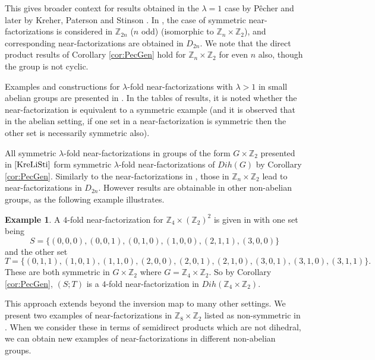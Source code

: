 \documentclass[12pt, a4paper]{article}
\theoremstyle{definition}
\newtheorem{example}[theorem]{Example}
\begin{document}
This gives broader context for results obtained in the $\lambda=1$ case by P\^{e}cher \cite{Pec} and later by Kreher, Paterson and Stinson \cite{KrePatSti}.  In \cite{KrePatSti}, the case of symmetric near-factorizations is considered in $\mathbb{Z}_{2n}$ ($n$ odd) (isomorphic to $\mathbb{Z}_n \times \mathbb{Z}_2$), and corresponding near-factorizations are obtained in $D_{2n}$. We note that the direct product results of Corollary \ref{cor:PecGen} hold for $\mathbb{Z}_n \times \mathbb{Z}_2$ for even $n$ also, though the group is not cyclic.

Examples and constructions for $\lambda$-fold near-factorizations with $\lambda>1$ in small abelian groups are presented in \cite{KreLiSti}.  In the tables of results, it is noted whether the near-factorization is equivalent to a symmetric example (and it is observed that in the abelian setting, if one set in a near-factorization is symmetric then the other set is necessarily symmetric also).  

All symmetric $\lambda$-fold near-factorizations in groups of the form $G \times \mathbb{Z}_2$ presented in $\cite{KreLiSti}$ form symmetric $\lambda$-fold near-factorizations of $Dih(G)$ by Corollary \ref{cor:PecGen}.  Similarly to the near-factorizations in \cite{Pec,KrePatSti}, those in $\mathbb{Z}_n \times \mathbb{Z}_2$ lead to near-factorizations in $D_{2n}$.  However results are obtainable in other non-abelian groups, as the following example illustrates.

\begin{example}
A $4$-fold near-factorization for $\mathbb{Z}_4 \times(\mathbb{Z}_2)^2$ is given in \cite{KreLiSti} with one set being
$$ S=\{(0,0,0), (0,0,1),(0,1,0),(1,0,0),(2,1,1),(3,0,0)\}$$
and the other set 
$$T=\{(0,1,1),(1,0,1),(1,1,0),(2,0,0),(2,0,1),(2,1,0),(3,0,1),(3,1,0),(3,1,1)\}.$$
These are both symmetric in $G \times \mathbb{Z}_2$ where $G=\mathbb{Z}_4 \times \mathbb{Z}_2$. So by Corollary \ref{cor:PecGen}, $(S;T)$ is a $4$-fold near-factorization in $Dih(\mathbb{Z}_4 \times \mathbb{Z}_2)$. 
\end{example}

This approach extends beyond the inversion map to many other settings.  We present two examples of near-factorizations in $\mathbb{Z}_8 \times \mathbb{Z}_2$ listed as non-symmetric in \cite{KreLiSti}.  When we consider these in terms of semidirect products which are not dihedral, we can obtain new examples of near-factorizations in different non-abelian groups.
\end{document}
